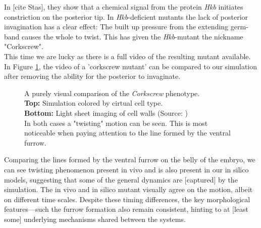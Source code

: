 In [cite Stas], they show that a chemical signal from the protein \textit{Hkb} initiates constriction on the posterior tip. In \textit{Hkb}-deficient mutants the lack of posterior invagination has a clear effect: The built up pressure from the extending germ-band causes the whole to twist. This has given the \textit{Hkb}-mutant the nickname "Corkscrew".\\

This time we are lucky as there is a full video of the resulting mutant available. In Figure \ref{fig:corkscrew-comparison}, the video of a 'corkscrew mutant' can be compared to our simulation after removing the ability for the posterior to invaginate.

 
\begin{figure}[H]
    \centering
    \caption{A purely visual comparison of the \textit{Corkscrew} phenotype.\\
    \textbf{Top:} Simulation colored by cirtual cell type. \\
    \textbf{Bottom:} Light sheet imaging of cell walls (Source: )\\ In both cases  a "twisting" motion can be seen. This is most noticeable when paying attention to the line formed by the ventral furrow.}
    \label{fig:corkscrew-comparison}
\end{figure}

Comparing the lines formed by the ventral furrow on the belly of the embryo, we can see twisting phenomenon present in vivo and is also present in our in silico models, suggesting that some of the general dynamics are [captured] by the simulation. The in vivo and in silico mutant visually agree on the motion, albeit on different time scales. Despite these timing differences, the key morphological features—such the furrow formation also remain consistent, hinting to at [least some] underlying mechanisms shared between the systems.


